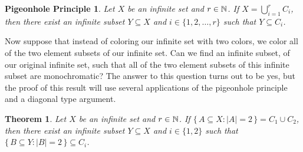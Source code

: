 \documentclass[12pt]{article}
\theoremstyle{plain}
\newtheorem*{php}{Pigeonhole Principle}
\newtheorem{thm}{Theorem}[section]
\begin{document}
\begin{php}
  Let $X$ be an infinite set and $r \in \mathbb{N}$.
  If $X = \bigcup_{i=1}^r C_i$, then there exist an infinite subset $Y
  \subseteq X$ and $i \in \{1, 2, \ldots, r\}$ such that $Y \subseteq
  C_i$.
\end{php}

Now suppose that instead of coloring our infinite set with two colors,
we color all of the two element subsets of our infinite set. 
Can we find an infinite subset, of our original infinite set, such
that all of the two element subsets of this infinite subset are
monochromatic?
The answer to this question turns out to be yes, but the proof of this
result will use several applications of the pigeonhole principle and a
diagonal type argument.

\begin{thm}
  \label{thm:ramsey2Col}
  Let $X$ be an infinite set and $r \in \mathbb{N}$.
  If $\{\, A \subseteq X : |A| = 2 \,\} = C_1 \cup C_2$, then there
  exist an infinite subset $Y \subseteq X$ and $i \in \{1, 2\}$ such
  that $\{\, B \subseteq Y : |B| = 2 \,\} \subseteq C_i$.
\end{thm}
\end{document}
